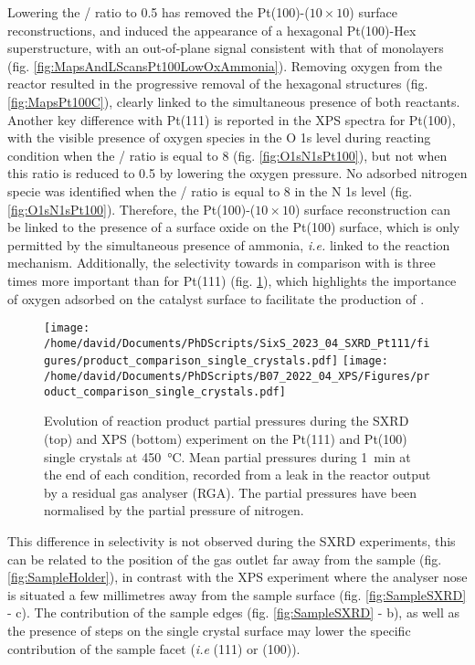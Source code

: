 Lowering the / ratio to \num{0.5} has removed the Pt(100)-($10\times10$) surface reconstructions, and induced the appearance of a hexagonal Pt(100)-Hex superstructure, with an out-of-plane signal consistent with that of monolayers (fig. \ref{fig:MapsAndLScansPt100LowOxAmmonia}).
Removing oxygen from the reactor resulted in the progressive removal of the hexagonal structures (fig. \ref{fig:MapsPt100C}), clearly linked to the simultaneous presence of both reactants.
Another key difference with Pt(111) is reported in the XPS spectra for Pt(100), with the visible presence of oxygen species in the O 1s level during reacting condition when the / ratio is equal to \num{8} (fig. \ref{fig:O1sN1sPt100}), but not when this ratio is reduced to \num{0.5} by lowering the oxygen pressure.
No adsorbed nitrogen specie was identified when the / ratio is equal to \num{8} in the N 1s level  (fig. \ref{fig:O1sN1sPt100}).
Therefore, the Pt(100)-($10\times10$) surface reconstruction can be linked to the presence of a surface oxide on the Pt(100) surface, which is only permitted by the simultaneous presence of ammonia, \textit{i.e.} linked to the reaction mechanism.
Additionally, the selectivity towards  in comparison with  is three times more important than for Pt(111) (fig. \ref{fig:RGA450Pt111AndPt100}), which highlights the importance of oxygen adsorbed on the catalyst surface to facilitate the production of .

\begin{figure}[!htb]
    \centering
    \texttt{[image: /home/david/Documents/PhDScripts/SixS\_2023\_04\_SXRD\_Pt111/figures/product\_comparison\_single\_crystals.pdf]}
    \texttt{[image: /home/david/Documents/PhDScripts/B07\_2022\_04\_XPS/Figures/product\_comparison\_single\_crystals.pdf]}
    \caption{
        Evolution of reaction product partial pressures during the SXRD (top) and XPS (bottom) experiment on the Pt(111) and Pt(100) single crystals at \qty{450}{\degreeCelsius}.
        Mean partial pressures during \qty{1}{\minute} at the end of each condition, recorded from a leak in the reactor output by a residual gas analyser (RGA).
        The partial pressures have been normalised by the partial pressure of nitrogen.
    }
    \label{fig:RGA450Pt111AndPt100}
\end{figure}

This difference in selectivity is not observed during the SXRD experiments, this can be related to the position of the gas outlet far away from the sample (fig. \ref{fig:SampleHolder}), in contrast with the XPS experiment where the analyser nose is situated a few millimetres away from the sample surface (fig. \ref{fig:SampleSXRD} - c).
The contribution of the sample edges (fig. \ref{fig:SampleSXRD} - b), as well as the presence of steps on the single crystal surface may lower the specific contribution of the sample facet (\textit{i.e} (111) or (100)).

